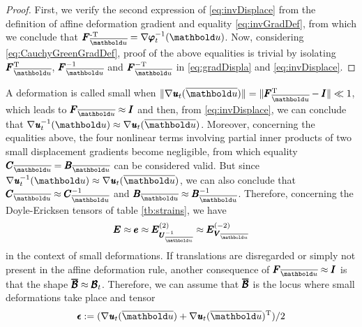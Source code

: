 {\footnotesize
\begin{proof}
First, we verify the second expression of \eqref{eq:invDisplace} from the definition of affine deformation gradient and equality \eqref{eq:invGradDef}, from which we conclude that $\tnr{F}_{\overline{\vto{u}}}^{\text{-T}}=\fua{\nabla\tnr{\varphi}_t^{-1}}{\vto{u}}$. Now, considering \eqref{eq:CauchyGreenGradDef}, proof of the above equalities is trivial by isolating $\tnr{F}_{\overline{\vto{u}}}^{\text{T}}$, $\tnr{F}_{\overline{\vto{u}}}^{-1}$ and $\tnr{F}_{\overline{\vto{u}}}^{-\text{T}}$ in \eqref{eq:gradDispla} and \eqref{eq:invDisplace}.
\end{proof}
}

\noindent A deformation is called small when $\|\fua{\nabla\tnr{\mathit{u}}_t}{\overline{\vto{u}}}\|=\|\tnr{F}_{\overline{\vto{u}}}^{\text{T}} - \tnr{I}\|\ll 1$, which leads to $\tnr{F}_{\overline{\vto{u}}}\approx\tnr{I}$ and then, from \eqref{eq:invDisplace}, we can conclude that $\fua{\nabla\tnr{\mathit{u}}_t^{-1}}{\vto{u}}\approx\fua{\nabla\tnr{\mathit{u}}_t}{\overline{\vto{u}}}$. Moreover, concerning the equalities above, the four nonlinear terms involving partial inner products of two small displacement gradients become negligible, from which equality $\tnr{C}_{\overline{\vto{u}}}=\tnr{B}_{\overline{\vto{u}}}$ can be considered valid. But since $\fua{\nabla\tnr{\mathit{u}}_t^{-1}}{\vto{u}}\approx\fua{\nabla\tnr{\mathit{u}}_t}{\overline{\vto{u}}}$, we can also conclude that  $\tnr{C}_{\overline{\vto{u}}}\approx\tnr{C}_{\overline{\vto{u}}}^{-1}$ and $\tnr{B}_{\overline{\vto{u}}}\approx\tnr{B}_{\overline{\vto{u}}}^{-1}$. Therefore, concerning the Doyle-Ericksen tensors of table \ref{tb:strains}, we have
\begin{equation*}
\tnr{E} \approx \tnr{e} \approx  \tnr{E}_{\tnr{U}^{-1}_{\overline{\vto{u}}}}^{(2)} \approx \tnr{E}_{\tnr{V}_{\overline{\vto{u}}}}^{(-2)}
\end{equation*}
in the context of small deformations. If translations are disregarded or simply not present in the affine deformation rule, another consequence of $\tnr{F}_{\overline{\vto{u}}}\approx\tnr{I}$ is that the shape $\pmb{\overline{\mathcal{B}}}\approx\pmb{\mathcal{B}}_t$. Therefore, we can assume that $\pmb{\overline{\mathcal{B}}}$ is the locus where small deformations take place and tensor 
\begin{equation}\label{eq:infinitStrain}
 \tnr{\epsilon}:=(\fua{\nabla\tnr{\mathit{u}}_t}{\overline{\vto{u}}}+\fua{\nabla\tnr{\mathit{u}}_t}{\overline{\vto{u}}}^{\text{T}})/2
\end{equation}

